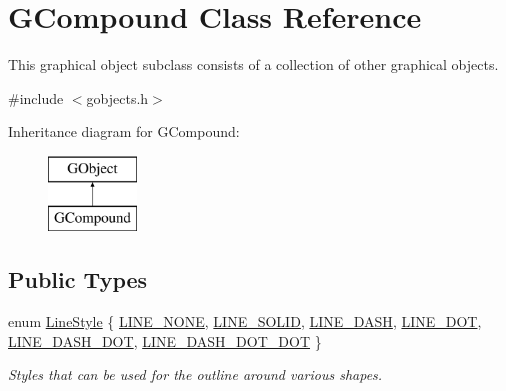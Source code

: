 \hypertarget{classsgl_1_1GCompound}{}\section{G\+Compound Class Reference}
\label{classsgl_1_1GCompound}


This graphical object subclass consists of a collection of other graphical objects.  




{\ttfamily \#include $<$gobjects.\+h$>$}

Inheritance diagram for G\+Compound\+:\begin{figure}[H]
\begin{center}
\leavevmode
\includegraphics[height=2.000000cm]{classsgl_1_1GCompound}
\end{center}
\end{figure}
\subsection*{Public Types}
\begin{DoxyCompactItemize}
\item 
enum \mbox{\hyperlink{classsgl_1_1GObject_a86e0f5648542856159bb40775c854aa7}{Line\+Style}} \{ \mbox{\hyperlink{classsgl_1_1GObject_a86e0f5648542856159bb40775c854aa7acbc84bd5232621834ed31f44d457c1eb}{L\+I\+N\+E\+\_\+\+N\+O\+NE}}, 
\mbox{\hyperlink{classsgl_1_1GObject_a86e0f5648542856159bb40775c854aa7a700c78bc2cd76acaab26651bf7b4941f}{L\+I\+N\+E\+\_\+\+S\+O\+L\+ID}}, 
\mbox{\hyperlink{classsgl_1_1GObject_a86e0f5648542856159bb40775c854aa7a9ccba0845f785d81d07b333ae1aad84e}{L\+I\+N\+E\+\_\+\+D\+A\+SH}}, 
\mbox{\hyperlink{classsgl_1_1GObject_a86e0f5648542856159bb40775c854aa7a8e811c096cb941997f0bfda168bb6df3}{L\+I\+N\+E\+\_\+\+D\+OT}}, 
\mbox{\hyperlink{classsgl_1_1GObject_a86e0f5648542856159bb40775c854aa7ada15a2e3d737b2db7706d8300f91b89d}{L\+I\+N\+E\+\_\+\+D\+A\+S\+H\+\_\+\+D\+OT}}, 
\mbox{\hyperlink{classsgl_1_1GObject_a86e0f5648542856159bb40775c854aa7aabf4053a73eafa7ba2b7e6d664c74c1d}{L\+I\+N\+E\+\_\+\+D\+A\+S\+H\+\_\+\+D\+O\+T\+\_\+\+D\+OT}}
 \}
\begin{DoxyCompactList}\small\item\em Styles that can be used for the outline around various shapes. \end{DoxyCompactList}\end{DoxyCompactItemize}
